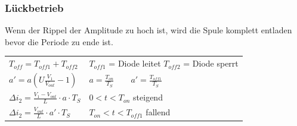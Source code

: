 \subsubsection{Lückbetrieb}
\begin{minipage}{0.75\linewidth}
    Wenn der Rippel der Amplitude zu hoch ist, wird die Spule komplett entladen bevor die Periode zu ende ist.

    \begin{tabular}{p{8cm} p{4cm}}
    $ T_{off} = T_{off1}+T_{off2} $ &
    $ T_{off1}$ = Diode leitet \newline
    $ T_{off2}$ = Diode sperrt
    \\  
    
    $a' = a (U\frac{V_1}{V_{out}}-1)$&
    $ a = \frac{T_{on}}{T_S} \qquad  a' = \frac{T_{off1}}{T_S}$
    \\
    
    $ \varDelta i_2 = \frac{V_1-V_{out}}{L}\cdot a \cdot T_S $&
    $ 0 < t < T_{on} $ steigend
    \\
    
    $ \varDelta i_2 = \frac{V_{out}}{L}\cdot a' \cdot T_S $&
    $ T_{on} < t < T_{off1} $ fallend
 
\end{tabular}
\end{minipage}
